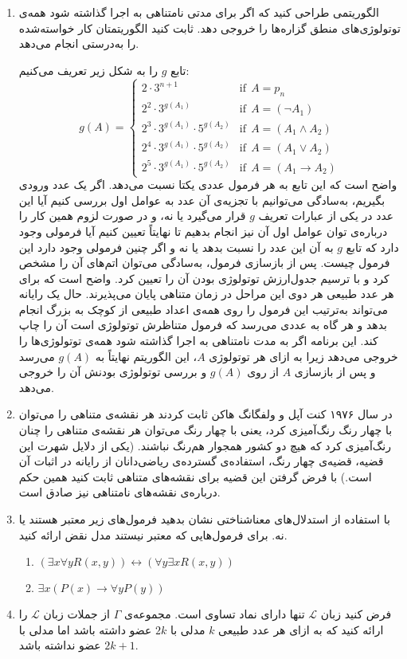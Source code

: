 \documentclass[12pt, 14paper]{article}
\begin{document}
\begin{enumerate}
\item
الگوریتمی طراحی کنید که اگر برای مدتی نامتناهی به اجرا گذاشته شود همه‌ی توتولوژی‌های منطق گزاره‌ها را خروجی دهد. ثابت کنید الگوریتمتان کار خواسته‌شده را به‌درستی انجام می‌دهد.

\begin{ans}
تابع $g$ را به شکل زیر تعریف می‌کنیم:
$$
g(A)=
\begin{cases}
2\cdot 3^{n+1} & \text{if}~~A = p_n\\
2^2\cdot 3^{g(A_1)} & \text{if}~~A=(\neg A_1)\\
2^3\cdot 3^{g(A_1)}\cdot 5^{g(A_2)} & \text{if}~~A=(A_1\wedge A_2) \\
2^4\cdot 3^{g(A_1)}\cdot 5^{g(A_2)} & \text{if}~~A=(A_1\vee A_2) \\
2^5\cdot 3^{g(A_1)}\cdot 5^{g(A_2)} & \text{if}~~A=(A_1\rightarrow A_2)
\end{cases}
$$
واضح است که این تابع به هر فرمول عددی یکتا نسبت می‌دهد. اگر یک عدد ورودی بگیریم، به‌سادگی می‌توانیم با تجزیه‌ی آن عدد به عوامل اول بررسی کنیم آیا این عدد در یکی از عبارات تعریف $g$ قرار می‌گیرد یا نه، و در صورت لزوم همین کار را درباره‌ی توان عوامل اول آن نیز انجام بدهیم تا نهایتاً تعیین کنیم آیا فرمولی وجود دارد که تابع $g$ به آن این عدد را نسبت بدهد یا نه و اگر چنین فرمولی وجود دارد این فرمول چیست. پس از بازسازی فرمول، به‌سادگی می‌توان اتم‌های آن را مشخص کرد و با ترسیم جدول‌ارزش توتولوژی بودن آن را تعیین کرد. واضح است که برای هر عدد طبیعی هر دوی این مراحل در زمان متناهی پایان می‌پذیرند. حال یک رایانه می‌تواند به‌ترتیب این فرمول را روی همه‌ی اعداد طبیعی از کوچک به بزرگ انجام بدهد و هر گاه به عددی می‌رسد که فرمول متناظرش توتولوژی است آن را چاپ کند. این برنامه اگر به مدت نامتناهی به اجرا گذاشته شود همه‌ی توتولوژی‌ها را خروجی می‌دهد زیرا به ازای هر توتولوژی $A$، این الگوریتم نهایتاً به
$g(A)$
می‌رسد و پس از بازسازی $A$ از روی $g(A)$ و بررسی توتولوژی بودنش آن را خروجی می‌دهد.
\end{ans}

\item
در سال ۱۹۷۶ کنت آپل و ولفگانگ هاکن ثابت کردند هر نقشه‌ی متناهی را می‌توان با چهار رنگ رنگ‌آمیزی کرد، یعنی با چهار رنگ می‌توان هر نقشه‌ی متناهی را چنان رنگ‌آمیزی کرد که هیچ دو کشور همجوار هم‌رنگ نباشند. (یکی از دلایل شهرت این قضیه، قضیه‌ی چهار رنگ، استفاده‌ی گسترده‌ی ریاضی‌دانان از رایانه در اثبات آن است.) با فرض گرفتن این قضیه برای نقشه‌های متناهی ثابت کنید همین حکم درباره‌ی نقشه‌های نامتناهی نیز صادق است.


\item
با استفاده از استدلال‌های معناشناختی نشان بدهید فرمول‌های زیر معتبر هستند یا نه. برای فرمول‌هایی که معتبر نیستند مدل نقض ارائه کنید.
\begin{enumerate}
\item
$(\exists x\forall y R(x,y))\leftrightarrow(\forall y \exists x R(x,y))$
\item
$\exists x(P(x)\to \forall y P(y))$
\end{enumerate}

\item
فرض کنید زبان
$\mathcal{L}$
تنها دارای نماد تساوی است. مجموعه‌ی $\Gamma$ از جملات زبان $\mathcal{L}$ را ارائه کنید که به ازای هر عدد طبیعی $k$ مدلی با $2k$ عضو داشته باشد اما مدلی با $2k+1$ عضو نداشته باشد.

\end{enumerate}
\end{document}

